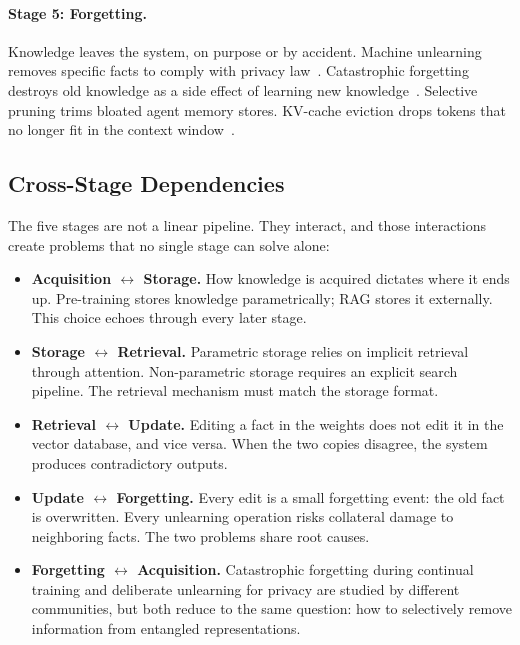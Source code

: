 \documentclass{article}
\begin{document}
\paragraph{Stage 5: Forgetting.} Knowledge leaves the system, on purpose or by accident. Machine unlearning removes specific facts to comply with privacy law~\citep{jang2023unlearning, maini2024tofu}. Catastrophic forgetting destroys old knowledge as a side effect of learning new knowledge~\citep{kirkpatrick2017ewc, luo2024catastrophic}. Selective pruning trims bloated agent memory stores. KV-cache eviction drops tokens that no longer fit in the context window~\citep{xiao2024streamingllm}.

\subsection{Cross-Stage Dependencies}

The five stages are not a linear pipeline. They interact, and those interactions create problems that no single stage can solve alone:

\begin{itemize}[leftmargin=*]
  \item \textbf{Acquisition $\leftrightarrow$ Storage.} How knowledge is acquired dictates where it ends up. Pre-training stores knowledge parametrically; RAG stores it externally. This choice echoes through every later stage.
  \item \textbf{Storage $\leftrightarrow$ Retrieval.} Parametric storage relies on implicit retrieval through attention. Non-parametric storage requires an explicit search pipeline. The retrieval mechanism must match the storage format.
  \item \textbf{Retrieval $\leftrightarrow$ Update.} Editing a fact in the weights does not edit it in the vector database, and vice versa. When the two copies disagree, the system produces contradictory outputs.
  \item \textbf{Update $\leftrightarrow$ Forgetting.} Every edit is a small forgetting event: the old fact is overwritten. Every unlearning operation risks collateral damage to neighboring facts. The two problems share root causes.
  \item \textbf{Forgetting $\leftrightarrow$ Acquisition.} Catastrophic forgetting during continual training and deliberate unlearning for privacy are studied by different communities, but both reduce to the same question: how to selectively remove information from entangled representations.
\end{itemize}
\end{document}
